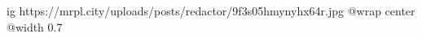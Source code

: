  
 
 
 
 

\ifcmt
  ig https://mrpl.city/uploads/posts/redactor/9f3s05hmynyhx64r.jpg
  @wrap center
  @width 0.7
\fi
